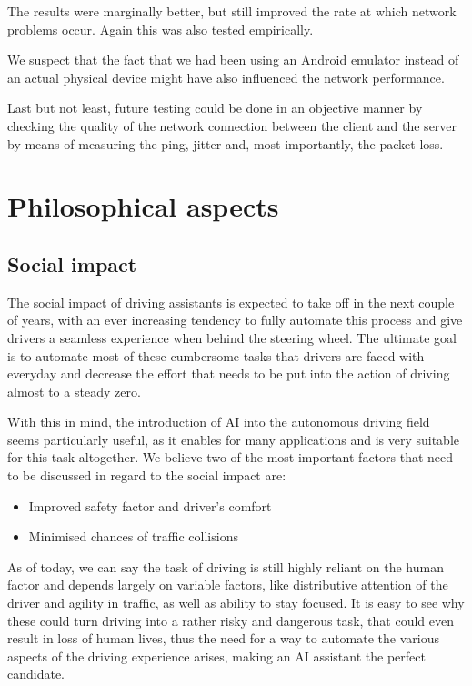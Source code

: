 \documentclass[runningheads,a4paper,11pt]{report}
\begin{document}
The results were marginally better, but still improved the rate at which network problems occur. Again this was also tested empirically.

We suspect that the fact that we had been using an Android emulator instead of an actual physical device might have also influenced the network performance.

Last but not least, future testing could be done in an objective manner by checking the quality of the network connection between the client and the server by means of measuring the ping, jitter and, most importantly, the packet loss.

\chapter{Philosophical aspects}

\section{Social impact}

The social impact of driving assistants is expected to take off in the next couple of years, with an ever increasing tendency to fully automate this process and give drivers a seamless experience when behind the steering wheel. The ultimate goal is to automate most of these cumbersome tasks that drivers are faced with everyday and decrease the effort that needs to be put into the action of driving almost to a steady zero. 

With this in mind, the introduction of AI into the autonomous driving field seems particularly useful, as it enables for many applications and is very suitable for this task altogether. We believe two of the most important factors that need to be discussed in regard to the social impact are:
\begin{itemize}
    \item Improved safety factor and driver's comfort
    \item Minimised chances of traffic collisions
\end{itemize}

As of today, we can say the task of driving is still highly reliant on the human factor and depends largely  on variable factors, like distributive attention of the driver and agility in traffic, as well as ability to stay focused. It is easy to see why these could turn driving into a rather risky and dangerous task, that could even result in loss of human lives, thus the need for a way to automate the various aspects of the driving experience arises, making an AI assistant the perfect candidate.
\end{document}
